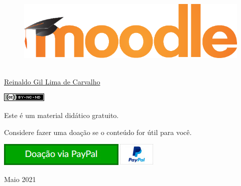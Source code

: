 \thispagestyle{empty}

\begin{center}
  \begin{figure}[H]
    \begin{center}
      \hspace{-1cm}
      \includegraphics[width=0.55\columnwidth]{titlepage}
  ~\cite{FrontPageIMG}
    \end{center}      
  \end{figure}

  \vskip 2cm

  \hspace{-1cm}
  \begin{minipage}[c]{17cm}
    \begin{center}

{\huge {}\vskip 0.15cm %

{\large \href{http://reinaldoc.wordpress.com}{Reinaldo Gil Lima de Carvalho}} %

{\includegraphics[width=0.1\columnwidth]{imgs/license-CC-BY-NC-ND_header.png}}

\vskip 7cm

{\large {Este é um material didático gratuito.}}

\vskip 0.15cm

{\large {Considere fazer uma doação se o conteúdo for útil para você.}}

\vskip 1cm

\href{https://www.paypal.com/cgi-bin/webscr?cmd=_s-xclick&hosted_button_id=9S2QRNKE3WKM6}{
    {\includegraphics[width=0.4\columnwidth]{imgs/donate.jpg}}
  }
}
    \end{center}
  \end{minipage}

  \vskip 3cm

  {\huge Maio 2021} %
\end{center}
